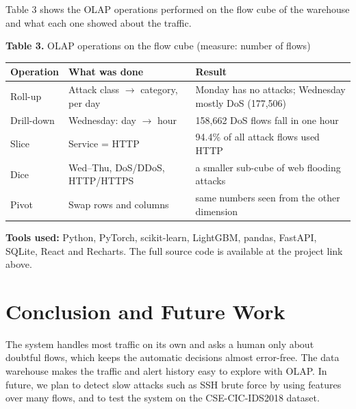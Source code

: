\documentclass[11pt,a4paper]{article}
\begin{document}
Table 3 shows the OLAP operations performed on the flow cube of the warehouse and what each one
showed about the traffic.

\begin{center}
\textbf{Table 3.} OLAP operations on the flow cube (measure: number of flows)\\[3pt]
\begin{tabular}{@{}lll@{}}
\toprule
Operation & What was done & Result \\
\midrule
Roll-up & Attack class $\to$ category, per day & Monday has no attacks; Wednesday mostly DoS (177,506) \\
Drill-down & Wednesday: day $\to$ hour & 158,662 DoS flows fall in one hour \\
Slice & Service = HTTP & 94.4\% of all attack flows used HTTP \\
Dice & Wed--Thu, DoS/DDoS, HTTP/HTTPS & a smaller sub-cube of web flooding attacks \\
Pivot & Swap rows and columns & same numbers seen from the other dimension \\
\bottomrule
\end{tabular}
\end{center}

\textbf{Tools used:} Python, PyTorch, scikit-learn, LightGBM, pandas, FastAPI, SQLite, React and
Recharts. The full source code is available at the project link above.

\section{Conclusion and Future Work}
The system handles most traffic on its own and asks a human only about doubtful flows, which
keeps the automatic decisions almost error-free. The data warehouse makes the traffic and alert
history easy to explore with OLAP. In future, we plan to detect slow attacks such as SSH brute
force by using features over many flows, and to test the system on the CSE-CIC-IDS2018 dataset.
\end{document}
